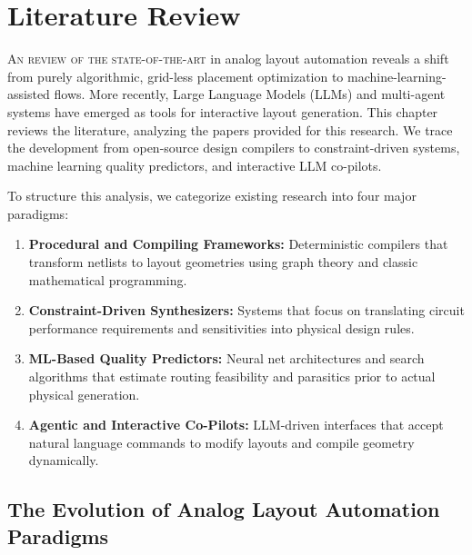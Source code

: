 
\chapter{Literature Review}
\label{ch:lit_review}

\lettrine[lines=3]{A}{n review of the state-of-the-art} in analog layout automation reveals a shift from purely algorithmic, grid-less placement optimization to machine-learning-assisted flows. More recently, Large Language Models (LLMs) and multi-agent systems have emerged as tools for interactive layout generation. This chapter reviews the literature, analyzing the papers provided for this research. We trace the development from open-source design compilers to constraint-driven systems, machine learning quality predictors, and interactive LLM co-pilots.

To structure this analysis, we categorize existing research into four major paradigms:
\begin{enumerate}
    \item \textbf{Procedural and Compiling Frameworks:} Deterministic compilers that transform netlists to layout geometries using graph theory and classic mathematical programming.
    \item \textbf{Constraint-Driven Synthesizers:} Systems that focus on translating circuit performance requirements and sensitivities into physical design rules.
    \item \textbf{ML-Based Quality Predictors:} Neural net architectures and search algorithms that estimate routing feasibility and parasitics prior to actual physical generation.
    \item \textbf{Agentic and Interactive Co-Pilots:} LLM-driven interfaces that accept natural language commands to modify layouts and compile geometry dynamically.
\end{enumerate}

\section[Evolution of Layout Automation]{The Evolution of Analog Layout Automation Paradigms}
\label{sec:lit_evolution}


